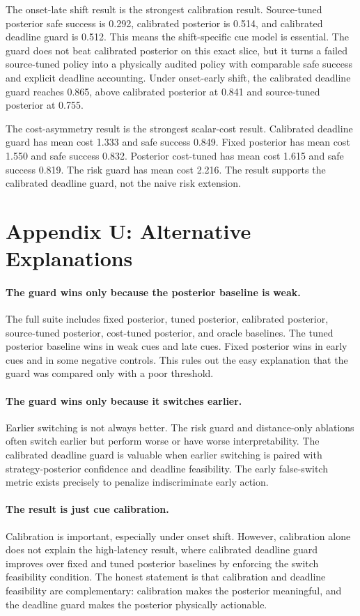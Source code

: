 \documentclass{article}
\begin{document}
The onset-late shift result is the strongest calibration result. Source-tuned posterior safe success is 0.292, calibrated posterior is 0.514, and calibrated deadline guard is 0.512. This means the shift-specific cue model is essential. The guard does not beat calibrated posterior on this exact slice, but it turns a failed source-tuned policy into a physically audited policy with comparable safe success and explicit deadline accounting. Under onset-early shift, the calibrated deadline guard reaches 0.865, above calibrated posterior at 0.841 and source-tuned posterior at 0.755.

The cost-asymmetry result is the strongest scalar-cost result. Calibrated deadline guard has mean cost 1.333 and safe success 0.849. Fixed posterior has mean cost 1.550 and safe success 0.832. Posterior cost-tuned has mean cost 1.615 and safe success 0.819. The risk guard has mean cost 2.216. The result supports the calibrated deadline guard, not the naive risk extension.

\section{Appendix U: Alternative Explanations}

\paragraph{The guard wins only because the posterior baseline is weak.}
The full suite includes fixed posterior, tuned posterior, calibrated posterior, source-tuned posterior, cost-tuned posterior, and oracle baselines. The tuned posterior baseline wins in weak cues and late cues. Fixed posterior wins in early cues and in some negative controls. This rules out the easy explanation that the guard was compared only with a poor threshold.

\paragraph{The guard wins only because it switches earlier.}
Earlier switching is not always better. The risk guard and distance-only ablations often switch earlier but perform worse or have worse interpretability. The calibrated deadline guard is valuable when earlier switching is paired with strategy-posterior confidence and deadline feasibility. The early false-switch metric exists precisely to penalize indiscriminate early action.

\paragraph{The result is just cue calibration.}
Calibration is important, especially under onset shift. However, calibration alone does not explain the high-latency result, where calibrated deadline guard improves over fixed and tuned posterior baselines by enforcing the switch feasibility condition. The honest statement is that calibration and deadline feasibility are complementary: calibration makes the posterior meaningful, and the deadline guard makes the posterior physically actionable.
\end{document}
